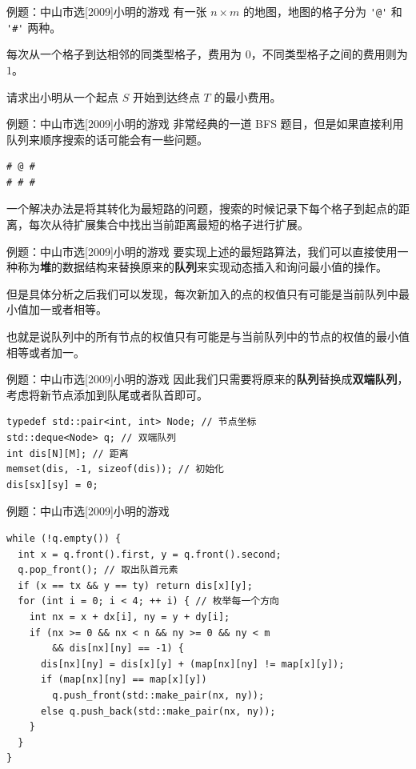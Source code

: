 \documentclass[12pt,aspectratio=169]{beamer}
\begin{document}
\begin{frame}[fragile]{例题：中山市选[2009]小明的游戏}
  有一张 $n \times m$ 的地图，地图的格子分为 \verb|'@'| 和 \verb|'#'| 两种。

  每次从一个格子到达相邻的同类型格子，费用为 $0$，不同类型格子之间的费用则为 $1$。

  请求出小明从一个起点 $S$ 开始到达终点 $T$ 的最小费用。
\end{frame}

\begin{frame}[fragile]{例题：中山市选[2009]小明的游戏}
  非常经典的一道 BFS 题目，但是如果直接利用队列来顺序搜索的话可能会有一些问题。

  \begin{verbatim}
# @ #
# # #
  \end{verbatim}
  \pause

  一个解决办法是将其转化为最短路的问题，搜索的时候记录下每个格子到起点的距离，每次从待扩展集合中找出当前距离最短的格子进行扩展。
\end{frame}

\begin{frame}[fragile]{例题：中山市选[2009]小明的游戏}
  要实现上述的最短路算法，我们可以直接使用一种称为\textbf{堆}的数据结构来替换原来的\textbf{队列}来实现动态插入和询问最小值的操作。

  但是具体分析之后我们可以发现，每次新加入的点的权值只有可能是当前队列中最小值加一或者相等。

  也就是说队列中的所有节点的权值只有可能是与当前队列中的节点的权值的最小值相等或者加一。

\end{frame}

\begin{frame}[fragile]{例题：中山市选[2009]小明的游戏}
  因此我们只需要将原来的\textbf{队列}替换成\textbf{双端队列}，考虑将新节点添加到队尾或者队首即可。

  \begin{verbatim}
typedef std::pair<int, int> Node; // 节点坐标
std::deque<Node> q; // 双端队列
int dis[N][M]; // 距离
memset(dis, -1, sizeof(dis)); // 初始化
dis[sx][sy] = 0;
  \end{verbatim}
\end{frame}

\begin{frame}[fragile]{例题：中山市选[2009]小明的游戏}
  \begin{verbatim}
while (!q.empty()) {
  int x = q.front().first, y = q.front().second;
  q.pop_front(); // 取出队首元素
  if (x == tx && y == ty) return dis[x][y];
  for (int i = 0; i < 4; ++ i) { // 枚举每一个方向
    int nx = x + dx[i], ny = y + dy[i];
    if (nx >= 0 && nx < n && ny >= 0 && ny < m
        && dis[nx][ny] == -1) {
      dis[nx][ny] = dis[x][y] + (map[nx][ny] != map[x][y]);
      if (map[nx][ny] == map[x][y])
        q.push_front(std::make_pair(nx, ny));
      else q.push_back(std::make_pair(nx, ny));
    }
  }
}
  \end{verbatim}
\end{frame}
\end{document}
